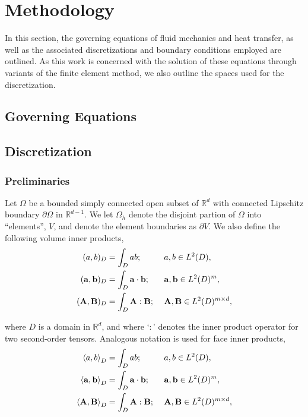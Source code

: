 \chapter{Methodology}

In this section, the governing equations of fluid mechanics and heat transfer, as well as the associated discretizations and boundary conditions employed are outlined. As this work is concerned with the solution of these equations through variants of the finite element method, we also outline the spaces used for the discretization.



\section{Governing Equations} \label{sec:governing_eqns_NS}


\section{Discretization}

\subsection{Preliminaries}
Let $\Omega$ be a bounded simply connected open subset of $\mathbb{R}^d$ with connected Lipschitz boundary $\partial \Omega$ in $\mathbb{R}^{d-1}$. We let $\Omega_h$ denote the disjoint partion of $\Omega$ into ``elements'', $V$, and denote the element boundaries as $\partial V$. We also define the following volume inner products,
\begin{alignat*}{5}
(a,b)_D & = \int_D ab;\ && a, b \in L^2(D), \\
(\vect{a},\vect{b})_D & = \int_D \vect{a} \cdot \vect{b};\ && \vect{a}, \vect{b} \in L^2(D)^m, \\
(\vect{A},\vect{B})_D & = \int_D \vect{A} : \vect{B};\ && \vect{A}, \vect{B} \in L^2(D)^{m \times d},
\end{alignat*}

where $D$ is a domain in $\mathbb{R}^d$, and where `$:$' denotes the inner product operator for two second-order tensors. Analogous notation is used for face inner products,
\begin{alignat*}{5}
\left< a,b \right>_D & = \int_D ab;\ && a, b \in L^2(D), \\
\left< \mathbf{{a}},\mathbf{{b}} \right>_D & = \int_D \mathbf{{a}} \cdot \mathbf{{b}};\ && \mathbf{{a}}, \mathbf{{b}} \in L^2(D)^m, \\
\left<\mathbf{{A}},\mathbf{{B}}\right>_D & = \int_D \mathbf{{A}} : \mathbf{{B}};\ && \mathbf{{A}}, \mathbf{{B}} \in L^2(D)^{m \times d},
\end{alignat*}

